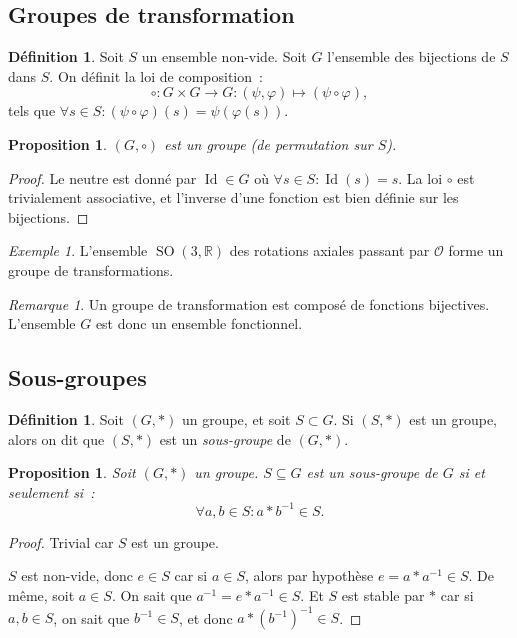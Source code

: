 \documentclass{article}
\newtheorem{prp}[thm]{Proposition}
\theoremstyle{definition}
\newtheorem{déf}[thm]{Définition}
\theoremstyle{remark}
\newtheorem*{rmq}{Remarque}
\newtheorem{ex}{Exemple}[section]
\DeclareMathOperator{\Id}{Id}
\DeclareMathOperator{\SO}{SO}
\newcommand{\R}{\mathbb R}
\newcommand{\proofright}{{\framebox[1.5\width]{$\Rightarrow$}\hspace{.1cm}}}
\newcommand{\proofleft}{{\framebox[1.5\width]{$\Leftarrow$}\hspace{.1cm}}}
\begin{document}
	\subsection{Groupes de transformation}
		\begin{déf} Soit $S$ un ensemble non-vide. Soit $G$ l'ensemble des bijections de $S$ dans $S$. On définit la loi de composition~:
		\[\circ : G \times G \to G : (\psi, \varphi) \mapsto (\psi \circ \varphi),\]
		tels que $\forall s \in S : (\psi \circ \varphi)(s) = \psi(\varphi(s))$.
		\end{déf}

		\begin{prp} $(G, \circ)$ est un groupe (de permutation sur $S$).
		\end{prp}

		\begin{proof} Le neutre est donné par $\Id \in G$ où $\forall s \in S : \Id(s) = s$. La loi $\circ$ est trivialement associative, et l'inverse d'une
		fonction est bien définie sur les bijections.
		\end{proof}

		\begin{ex} L'ensemble $\SO(3, \R)$ des rotations axiales passant par $\mathcal O$ forme un groupe de transformations.
		\end{ex}

		\begin{rmq} Un groupe de transformation est composé de fonctions bijectives. L'ensemble $G$ est donc un ensemble fonctionnel.
		\end{rmq}

	\subsection{Sous-groupes}
		\begin{déf} Soit $(G, *)$ un groupe, et soit $S \subset G$. Si $(S, *)$ est un groupe, alors on dit que $(S, *)$ est un \textit{sous-groupe} de $(G, *)$.
		\end{déf}

		\begin{prp} Soit $(G, *)$ un groupe. $S \subseteq G$ est un sous-groupe de $G$ si et seulement si~:
		\[\forall a, b \in S : a*b^{-1} \in S.\]
		\end{prp}

		\begin{proof} \proofright Trivial car $S$ est un groupe.

		\proofleft $S$ est non-vide, donc $e \in S$ car si $a \in S$, alors par hypothèse $e = a*a^{-1} \in S$. De même, soit $a \in S$. On sait que
		$a^{-1} = e*a^{-1} \in S$. Et $S$ est stable par $*$ car si $a, b \in S$, on sait que $b^{-1} \in S$, et donc $a*\left(b^{-1}\right)^{-1} \in S$.
		\end{proof}
\end{document}
